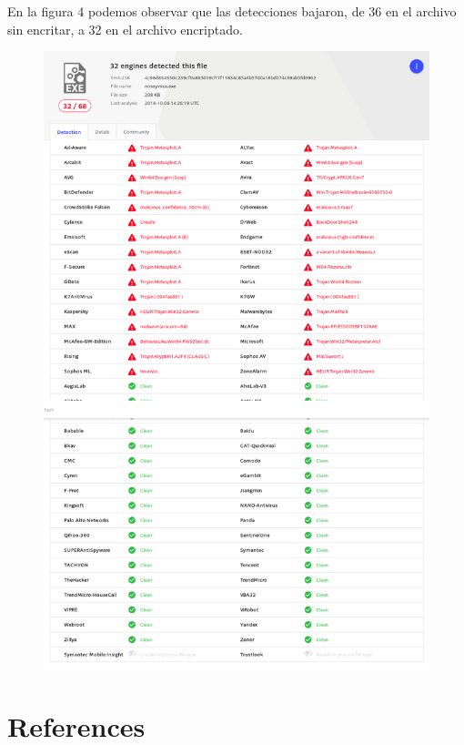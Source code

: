 En la figura 4 podemos observar que las detecciones bajaron, de 36 en el archivo sin encritar, a 32 en el archivo encriptado.
\begin{figure}[!ht]
   \centering
   \includegraphics[scale=0.3]{images/screen_encypt.png}
   \caption{}
   \centering
\end{figure}

\pagebreak
\pagebreak
\newpage
\section*{References}



